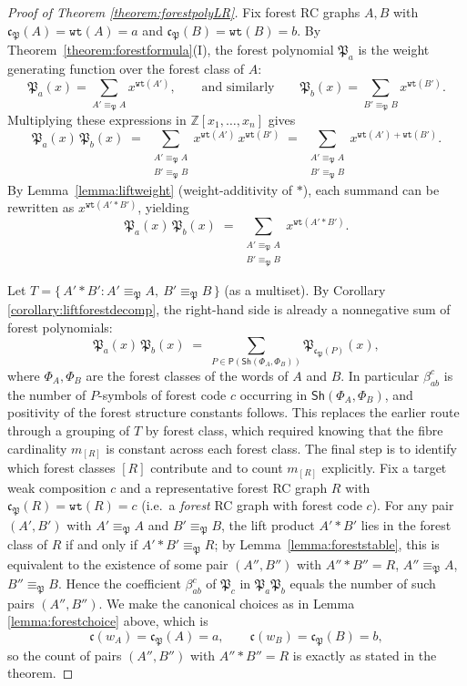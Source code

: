 \documentclass{amsart}
\theoremstyle{definition}
\theoremstyle{remark}
\numberwithin{equation}{subsection}
\newcommand{\wof}[1]{w_{#1}}
\newcommand{\wtt}{\mathtt{wt}}
\newcommand{\code}{\mathfrak{c}}
\newcommand{\forest}{\mathfrak{P}}
\begin{document}
\begin{proof}[Proof of Theorem \ref{theorem:forestpolyLR}]
Fix forest RC graphs $A, B$ with $\code_\forest(A)=\wtt(A)=a$ and $\code_\forest(B)=\wtt(B)=b$. By Theorem~\ref{theorem:forestformula}(I), the forest polynomial $\forest_a$ is the weight generating function over the forest class of $A$:
$$\forest_a(x) = \sum_{A'\equiv_\forest A} x^{\wtt(A')},\qquad\text{and similarly}\qquad \forest_b(x) = \sum_{B'\equiv_\forest B} x^{\wtt(B')}.$$
Multiplying these expressions in $\mathbb{Z}[x_1,\ldots,x_n]$ gives
$$\forest_a(x)\,\forest_b(x) \;=\; \sum_{\substack{A'\equiv_\forest A\\ B'\equiv_\forest B}} x^{\wtt(A')}\,x^{\wtt(B')}\;=\;\sum_{\substack{A'\equiv_\forest A\\ B'\equiv_\forest B}} x^{\wtt(A')+\wtt(B')}.$$
By Lemma~\ref{lemma:liftweight} (weight-additivity of $*$), each summand can be rewritten as $x^{\wtt(A'*B')}$, yielding
$$\forest_a(x)\,\forest_b(x) \;=\; \sum_{\substack{A'\equiv_\forest A\\ B'\equiv_\forest B}} x^{\wtt(A'*B')}.$$

Let $T = \{\,A'*B' : A'\equiv_\forest A,\ B'\equiv_\forest B\,\}$ (as a multiset). By Corollary \ref{corollary:liftforestdecomp}, the right-hand side is already a nonnegative sum of forest polynomials:
$$\forest_a(x)\,\forest_b(x)\;=\;\sum_{P\in\mathsf{P}(\mathsf{Sh}(\Phi_A,\Phi_B))}\forest_{\code_\forest(P)}(x),$$
where $\Phi_A,\Phi_B$ are the forest classes of the words of $A$ and $B$. In particular $\beta_{ab}^c$ is the number of $P$-symbols of forest code $c$ occurring in $\mathsf{Sh}(\Phi_A,\Phi_B)$, and positivity of the forest structure constants follows. This replaces the earlier route through a grouping of $T$ by forest class, which required knowing that the fibre cardinality $m_{[R]}$ is constant across each forest class.
The final step is to identify which forest classes $[R]$ contribute and to count $m_{[R]}$ explicitly. Fix a target weak composition $c$ and a representative forest RC graph $R$ with $\code_\forest(R)=\wtt(R)=c$ (i.e.\ a \emph{forest} RC graph with forest code $c$). For any pair $(A',B')$ with $A'\equiv_\forest A$ and $B'\equiv_\forest B$, the lift product $A'*B'$ lies in the forest class of $R$ if and only if $A'*B'\equiv_\forest R$; by Lemma~\ref{lemma:foreststable}, this is equivalent to the existence of some pair $(A'',B'')$ with $A''*B''=R$, $A''\equiv_\forest A$, $B''\equiv_\forest B$. Hence the coefficient $\beta_{ab}^c$ of $\forest_c$ in $\forest_a\forest_b$ equals the number of such pairs $(A'',B'')$. We make the canonical choices as in Lemma \ref{lemma:forestchoice} above, which is 
$$\code(\wof{A})=\code_\forest(A)=a,\qquad \code(\wof{B})=\code_\forest(B)=b,$$
so the count of pairs $(A'',B'')$ with $A''*B''=R$ is exactly as stated in the theorem.
\end{proof}
\end{document}
